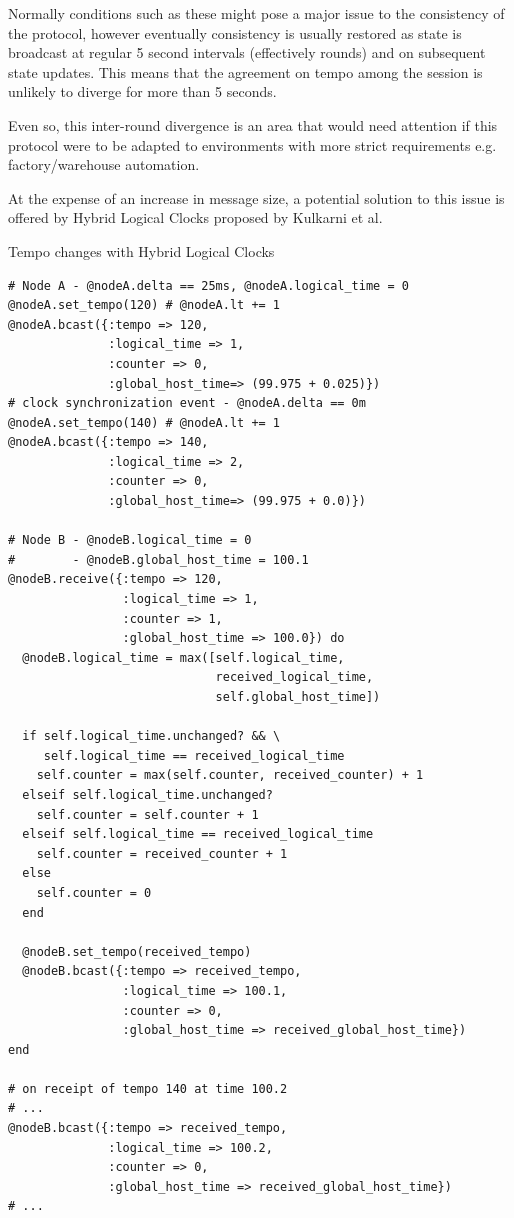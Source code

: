 \documentclass[11pt]{article} %
\theoremstyle{plain}
\theoremstyle{definition}
\begin{document}
Normally conditions such as these might pose a major issue to the consistency
of the protocol, however eventually consistency is usually restored as state is
broadcast at regular 5 second intervals (effectively rounds) and on subsequent
state updates. This means that the agreement on tempo among the session is
unlikely to diverge for more than 5 seconds.

Even so, this inter-round divergence is an area that would need attention if
this protocol were to be adapted to environments with more strict requirements
e.g. factory/warehouse automation.

At the expense of an increase in message size, a potential solution to this
issue is offered by Hybrid Logical Clocks\cite{kulkarni2014logical} proposed by
Kulkarni et al.

\begin{algorithm}
  \caption{Tempo changes with Hybrid Logical Clocks}\label{linkhlc}
\begin{algorithmic}[1]
\item{ }
\end{algorithmic}
\end{algorithm}

\begin{verbatim}
# Node A - @nodeA.delta == 25ms, @nodeA.logical_time = 0
@nodeA.set_tempo(120) # @nodeA.lt += 1
@nodeA.bcast({:tempo => 120,
              :logical_time => 1,
              :counter => 0,
              :global_host_time=> (99.975 + 0.025)})
# clock synchronization event - @nodeA.delta == 0m
@nodeA.set_tempo(140) # @nodeA.lt += 1
@nodeA.bcast({:tempo => 140,
              :logical_time => 2,
              :counter => 0,
              :global_host_time=> (99.975 + 0.0)})

# Node B - @nodeB.logical_time = 0
#        - @nodeB.global_host_time = 100.1
@nodeB.receive({:tempo => 120,
                :logical_time => 1,
                :counter => 1,
                :global_host_time => 100.0}) do
  @nodeB.logical_time = max([self.logical_time,
                             received_logical_time,
                             self.global_host_time])

  if self.logical_time.unchanged? && \
     self.logical_time == received_logical_time
    self.counter = max(self.counter, received_counter) + 1
  elseif self.logical_time.unchanged?
    self.counter = self.counter + 1
  elseif self.logical_time == received_logical_time
    self.counter = received_counter + 1
  else
    self.counter = 0
  end

  @nodeB.set_tempo(received_tempo)
  @nodeB.bcast({:tempo => received_tempo,
                :logical_time => 100.1,
                :counter => 0,
                :global_host_time => received_global_host_time})
end

# on receipt of tempo 140 at time 100.2
# ...
@nodeB.bcast({:tempo => received_tempo,
              :logical_time => 100.2,
              :counter => 0,
              :global_host_time => received_global_host_time})
# ...
\end{verbatim}
\end{document}
